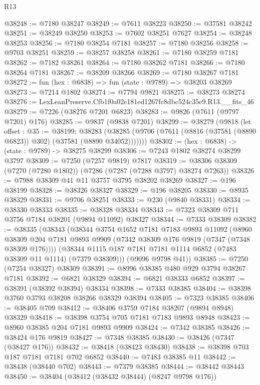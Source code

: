 \begin{lexlean}{R13}
\begin{coremodule}
@38248 := @7180 @38247
@38249 := @7611 @38223
@38250 := @37581 @38242
@38251 := @38249 @38250
@38253 := @7602 @38251 @7627
@38254 := @38248 @38253
@38256 := @7180 @38254 @7181
@38257 := @7180 @38256
@38258 := @9703 @38251
@38259 := @38257 @38258
@38261 := @7180 @38259 @7181
@38262 := @7182 @38261
@38264 := @7180 @38262 @7181
@38266 := @7180 @38264 @7181
@38267 := @38209 @38266
@38269 := @7180 @38267 @7181
@38272 := fun (hex : @6838) => fun (state : @9789) => @38203 @38269
@38273 := @7214 @1802
@38274 := @7794 @9821
@38275 := @38273 @38274
@38276 := LexLeanPreserve.Cfb1f0a02e181ed1267fc8dbc524c35e9.R13.__fits_46
@38279 := @7226 (@38276 @7201 @6823)
@38283 := @9826 (@7611 (@9797 @7201) @176)
@38285 := @9837 (@9838 @7201)
@38299 := @38279
    (@9818
      (let offset : @35 := @38199;
      @38283 (@38285 (@9706 (@7611 (@8816 (@37581 (@8890 @6823)) @302) (@37581 (@8890 @34052)))))))
@38302 := (hex : @6838) -> (state : @9789) -> @38275 @38299
@38306 := @7243 @1802 @38274 @38299 @3797
@38309 := @7250 (@7257 @9819) @7817
@38319 := @38306 @38309 (@7270 (@7280 @1802)) (@7286 (@7287 (@7288 @3797) @38274 @7263))
@38326 := @7988 @38309 @41 @11 @3757 @3795 @38202 @38269
@38327 := @196 @38199
@38328 := @38326 @38327
@38329 := @196 @38205
@38330 := @8935 @38329
@38331 := @9706 @38251
@38333 := @230 (@9840 @38331)
@38334 := @38330 @38333
@38335 := @38328 @38334
@38343 := @7323 @38309 @711 @3756 @7184 @38201 (@9894 @11092) @38327
@38344 := @7333 @38309
@38382 := @38335
    (@38343
      (@38344
        @3754
        @1652
        @7181
        @7183
        @9893
        @11092
        (@8960 @38309 @204 @7181 @9893 @9909 (@7342 @38309 @176 @9819 (@7347 (@7348 @38309 @176))))
        (@38344 @1115 @187 @7181 @7181 @1114 @6852 (@7483 @38309 @11 @1114) (@7379 @38309)))
      (@9096 @9798 @41))
@38385 := @7250 (@7254 @38327) @38309
@38391 := @8996 @38385 @480 @929 @3794 @38267 @7181
@38392 := @6821 @38329
@38394 := @6821 @38333 @6852
@38397 := @38391 (@38392 @38394) @38334
@38398 := @7333 @38385
@38404 := @38398 @3760 @3793 @38208 @38266 @38329 @38394
@38405 := @7323 @38385
@38406 := @38405 @709
@38412 := @38406 @3759 @7184 @38207 (@9894 @8948) @38329
@38418 := @38398 @3754 @705 @7181 @7183 @9893 @8948
@38423 := @8960 @38385 @204 @7181 @9893 @9909
@38424 := @7342 @38385
@38426 := @38424 @176 @9819
@38427 := @7348 @38385
@38430 := @38426 (@7347 (@38427 @176))
@38432 := @38418 (@38423 @38430)
@38438 := @38398 @703 @187 @7181 @7181 @702 @6852
@38440 := @7483 @38385 @11
@38442 := @38438 (@38440 @702)
@38443 := @7379 @38385
@38444 := @38442 @38443
@38450 := @38404 (@38412 (@38432 @38444) (@8247 @9798 @176))

\end{coremodule}
\end{lexlean}
